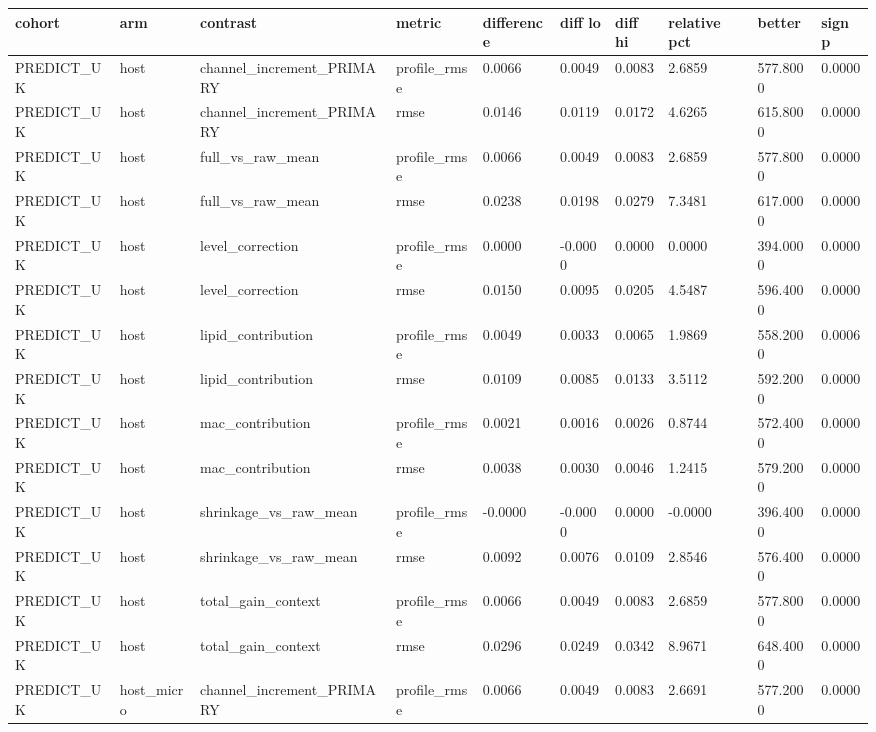 {\footnotesize\setlength{\tabcolsep}{3pt}
\begin{longtable}{llllllllll}
\toprule
\textbf{cohort} & \textbf{arm} & \textbf{contrast} & \textbf{metric} & \textbf{difference} & \textbf{diff lo} & \textbf{diff hi} & \textbf{relative pct} & \textbf{better} & \textbf{sign p} \\
\midrule
\endhead
PREDICT\_UK & host & channel\_increment\_PRIMARY & profile\_rmse & 0.0066 & 0.0049 & 0.0083 & 2.6859 & 577.8000 & 0.0000 \\
PREDICT\_UK & host & channel\_increment\_PRIMARY & rmse & 0.0146 & 0.0119 & 0.0172 & 4.6265 & 615.8000 & 0.0000 \\
PREDICT\_UK & host & full\_vs\_raw\_mean & profile\_rmse & 0.0066 & 0.0049 & 0.0083 & 2.6859 & 577.8000 & 0.0000 \\
PREDICT\_UK & host & full\_vs\_raw\_mean & rmse & 0.0238 & 0.0198 & 0.0279 & 7.3481 & 617.0000 & 0.0000 \\
PREDICT\_UK & host & level\_correction & profile\_rmse & 0.0000 & -0.0000 & 0.0000 & 0.0000 & 394.0000 & 0.0000 \\
PREDICT\_UK & host & level\_correction & rmse & 0.0150 & 0.0095 & 0.0205 & 4.5487 & 596.4000 & 0.0000 \\
PREDICT\_UK & host & lipid\_contribution & profile\_rmse & 0.0049 & 0.0033 & 0.0065 & 1.9869 & 558.2000 & 0.0006 \\
PREDICT\_UK & host & lipid\_contribution & rmse & 0.0109 & 0.0085 & 0.0133 & 3.5112 & 592.2000 & 0.0000 \\
PREDICT\_UK & host & mac\_contribution & profile\_rmse & 0.0021 & 0.0016 & 0.0026 & 0.8744 & 572.4000 & 0.0000 \\
PREDICT\_UK & host & mac\_contribution & rmse & 0.0038 & 0.0030 & 0.0046 & 1.2415 & 579.2000 & 0.0000 \\
PREDICT\_UK & host & shrinkage\_vs\_raw\_mean & profile\_rmse & -0.0000 & -0.0000 & 0.0000 & -0.0000 & 396.4000 & 0.0000 \\
PREDICT\_UK & host & shrinkage\_vs\_raw\_mean & rmse & 0.0092 & 0.0076 & 0.0109 & 2.8546 & 576.4000 & 0.0000 \\
PREDICT\_UK & host & total\_gain\_context & profile\_rmse & 0.0066 & 0.0049 & 0.0083 & 2.6859 & 577.8000 & 0.0000 \\
PREDICT\_UK & host & total\_gain\_context & rmse & 0.0296 & 0.0249 & 0.0342 & 8.9671 & 648.4000 & 0.0000 \\
PREDICT\_UK & host\_micro & channel\_increment\_PRIMARY & profile\_rmse & 0.0066 & 0.0049 & 0.0083 & 2.6691 & 577.2000 & 0.0000 \\

\end{longtable}}
